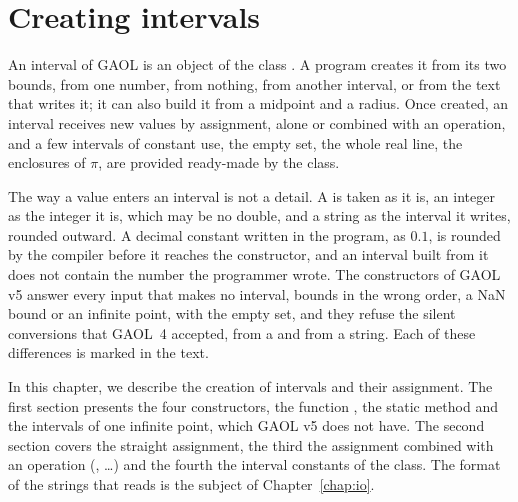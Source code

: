\chapter{Creating intervals}\label{chap:creation}

An interval of GAOL is an object of the class . A program
creates it from its two bounds, from one number, from nothing, from another
interval, or from the text that writes it; it can also build it from a
midpoint and a radius. Once created, an interval receives new values by
assignment, alone or combined with an operation, and a few intervals of
constant use, the empty set, the whole real line, the enclosures of $\pi$,
are provided ready-made by the class.

\medskip
The way a value enters an interval is not a detail. A  is taken
as it is, an integer as the integer it is, which may be no double, and a
string as the interval it writes, rounded outward. A decimal constant written
in the program, as $0.1$, is rounded by the compiler before it reaches the
constructor, and an interval built from it does not contain the number the
programmer wrote. The constructors of GAOL v5 answer every input that makes
no interval, bounds in the wrong order, a NaN bound or an infinite point, with
the empty set, and they refuse the silent conversions that GAOL~4 accepted,
from a  and from a string. Each of these differences is marked
in the text.

\medskip
In this chapter, we describe the creation of intervals and their assignment.
The first section presents the four constructors, the function
, the static method  and the intervals
of one infinite point, which GAOL v5 does not have. The second section covers
the straight assignment, the third the assignment combined with an operation
(\code{+=}, \code{\&=}\ldots) and the fourth the interval constants of the
class. The format of the strings that  reads is the
subject of Chapter~\ref{chap:io}.

